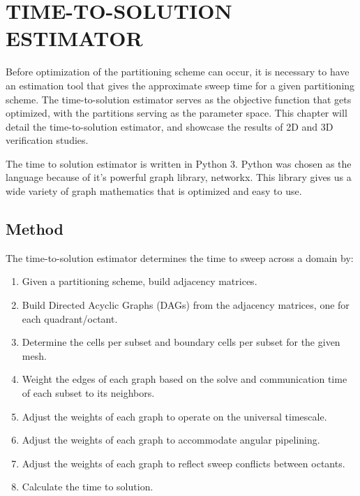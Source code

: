 %
%
%
%



\chapter{TIME-TO-SOLUTION ESTIMATOR \label{cha:tts}}

Before optimization of the partitioning scheme can occur, it is necessary to have an estimation tool that gives the approximate sweep time for a given partitioning scheme. The time-to-solution estimator serves as the objective function that gets optimized, with the partitions serving as the parameter space. This chapter will detail the time-to-solution estimator, and showcase the results of 2D and 3D verification studies. 

The time to solution estimator is written in Python 3. Python was chosen as the language because of it's powerful graph library, networkx. 
This library gives us a wide variety of graph mathematics that is optimized and easy to use. 

\section{Method}
The time-to-solution estimator determines the time to sweep across a domain by:
\begin{enumerate}
	\item Given a partitioning scheme, build adjacency matrices.
	\item Build Directed Acyclic Graphs  (DAGs) from the adjacency matrices, one for each quadrant/octant.
	\item Determine the cells per subset and boundary cells per subset for the given mesh.
	\item Weight the edges of each graph based on the solve and communication time of each subset to its neighbors.
	\item Adjust the weights of each graph to operate on the universal timescale.
	\item Adjust the weights of each graph to accommodate angular pipelining.
	\item Adjust the weights of each graph to reflect sweep conflicts between octants. 
	\item Calculate the time to solution.
\end{enumerate}

